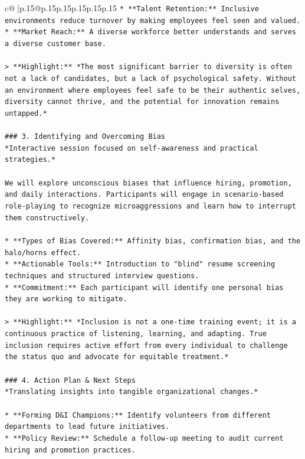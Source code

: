 \documentclass{article}
\begin{document}
{\begin{supertabular}{c@{$\;$}|p{.15\linewidth}@{}p{.15\linewidth}p{.15\linewidth}p{.15\linewidth}p{.15\linewidth}p{.15\linewidth}}
{{{\texttt{*   **Talent Retention:** Inclusive environments reduce turnover by making employees feel seen and valued.} \\
\texttt{*   **Market Reach:** A diverse workforce better understands and serves a diverse customer base.} \\
\\ 
\texttt{> **Highlight:** *The most significant barrier to diversity is often not a lack of candidates, but a lack of psychological safety. Without an environment where employees feel safe to be their authentic selves, diversity cannot thrive, and the potential for innovation remains untapped.*} \\
\\ 
\texttt{\#\#\# 3. Identifying and Overcoming Bias} \\
\texttt{*Interactive session focused on self{-}awareness and practical strategies.*} \\
\\ 
\texttt{We will explore unconscious biases that influence hiring, promotion, and daily interactions. Participants will engage in scenario{-}based role{-}playing to recognize microaggressions and learn how to interrupt them constructively.} \\
\\ 
\texttt{*   **Types of Bias Covered:** Affinity bias, confirmation bias, and the halo/horns effect.} \\
\texttt{*   **Actionable Tools:** Introduction to "blind" resume screening techniques and structured interview questions.} \\
\texttt{*   **Commitment:** Each participant will identify one personal bias they are working to mitigate.} \\
\\ 
\texttt{> **Highlight:** *Inclusion is not a one{-}time training event; it is a continuous practice of listening, learning, and adapting. True inclusion requires active effort from every individual to challenge the status quo and advocate for equitable treatment.*} \\
\\ 
\texttt{\#\#\# 4. Action Plan \& Next Steps} \\
\texttt{*Translating insights into tangible organizational changes.*} \\
\\ 
\texttt{*   **Forming D\&I Champions:** Identify volunteers from different departments to lead future initiatives.} \\
\texttt{*   **Policy Review:** Schedule a follow{-}up meeting to audit current hiring and promotion practices.} \\
}}}
\end{supertabular}}
\end{document}
